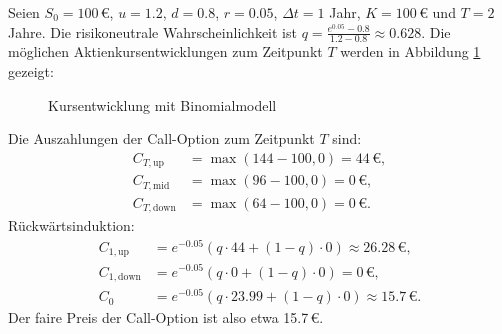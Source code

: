 \begin{bsp}
Seien $S_0 = 100\,€$, $u=1.2$, $d=0.8$, $r=0.05$, $\Delta t=1$ Jahr, $K=100\,€$ und $T=2$ Jahre.
Die risikoneutrale Wahrscheinlichkeit ist $q = \frac{e^{0.05}-0.8}{1.2-0.8} \approx 0.628$.
Die möglichen Aktienkursentwicklungen zum Zeitpunkt $T$ werden in Abbildung \ref{fig:binomialtree_options} gezeigt:
\begin{figure}[H]
\centering
{} 
\caption{Kursentwicklung mit Binomialmodell}
\label{fig:binomialtree_options}
\end{figure}
Die Auszahlungen der Call-Option zum Zeitpunkt $T$ sind:
$$
\begin{aligned}
C_{T,\text{up}} &= \max(144 - 100, 0) = 44\,€, \\
C_{T,\text{mid}} &= \max(96 - 100, 0) = 0\,€, \\
C_{T,\text{down}} &= \max(64 - 100, 0) = 0\,€.
\end{aligned}
$$
Rückwärtsinduktion:
$$
\begin{aligned}
C_{1,\text{up}} &= e^{-0.05} \left( q \cdot 44 + (1-q) \cdot 0 \right) \approx 26.28\,€, \\
C_{1,\text{down}} &= e^{-0.05} \left( q \cdot 0 + (1-q) \cdot 0 \right) = 0\,€, \\
C_0 &= e^{-0.05} \left( q \cdot 23.99 + (1-q) \cdot 0 \right) \approx 15.7\,€.
\end{aligned}
$$
Der faire Preis der Call-Option ist also etwa 15.7\,€.
\end{bsp}

